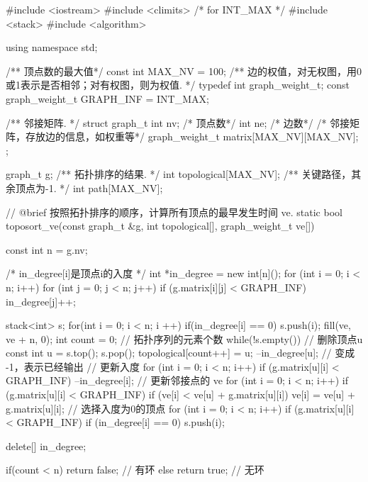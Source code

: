 \begin{Codex}[label=am_graph_critical_path.cpp]
    #include <iostream>
    #include <climits>  /* for INT_MAX */
    #include <stack>
    #include <algorithm>

    using namespace std;

    /** 顶点数的最大值*/
    const int MAX_NV = 100;
    /** 边的权值，对无权图，用0或1表示是否相邻；对有权图，则为权值. */
    typedef int graph_weight_t;
    const graph_weight_t GRAPH_INF = INT_MAX;

    /** 邻接矩阵. */
    struct graph_t {
        int nv; /* 顶点数*/
        int ne; /* 边数*/
        /* 邻接矩阵，存放边的信息，如权重等*/
        graph_weight_t matrix[MAX_NV][MAX_NV];
    };

    graph_t g;
    /** 拓扑排序的结果. */
    int topological[MAX_NV];
    /** 关键路径，其余顶点为-1. */
    int path[MAX_NV];

    // @brief 按照拓扑排序的顺序，计算所有顶点的最早发生时间 ve.
    static bool toposort_ve(const graph_t &g, int topological[],
            graph_weight_t ve[]) {
        const int n = g.nv;

        /* in_degree[i]是顶点i的入度 */
        int *in_degree = new int[n]();
        for (int i = 0; i < n; i++) {
            for (int j = 0; j < n; j++) {
                if (g.matrix[i][j] < GRAPH_INF)
                    in_degree[j]++;
            }
        }

        stack<int> s;
        for(int i = 0; i < n; i ++) {
            if(in_degree[i] == 0) {
                s.push(i);
            }
        }
        fill(ve, ve + n, 0);
        int count = 0; // 拓扑序列的元素个数
        while(!s.empty()) {
            // 删除顶点u
            const int u = s.top(); s.pop();
            topological[count++] = u;
            --in_degree[u];  // 变成 -1，表示已经输出
            // 更新入度
            for (int i = 0; i < n; i++) if (g.matrix[u][i] < GRAPH_INF) {
                --in_degree[i];
            }
            // 更新邻接点的 ve
            for (int i = 0; i < n; i++) if (g.matrix[u][i] < GRAPH_INF) {
                if (ve[i] < ve[u] + g.matrix[u][i])
                    ve[i] = ve[u] + g.matrix[u][i];
            }
            // 选择入度为0的顶点
            for (int i = 0; i < n; i++) if (g.matrix[u][i] < GRAPH_INF) {
                if (in_degree[i] == 0) s.push(i);
            }
        }

        delete[] in_degree;

        if(count < n) return false; // 有环
        else          return true;  // 无环
    }


\end{Codex}
